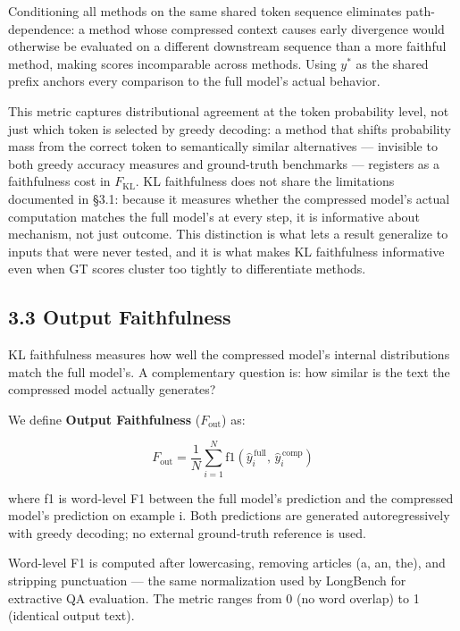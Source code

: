 \documentclass[10pt,letterpaper]{article}
\begin{document}
Conditioning all methods on the same shared token sequence eliminates
path-dependence: a method whose compressed context causes early
divergence would otherwise be evaluated on a different downstream
sequence than a more faithful method, making scores incomparable across
methods. Using \(y^*\) as the shared prefix anchors every comparison to
the full model's actual behavior.

This metric captures distributional agreement at the token probability
level, not just which token is selected by greedy decoding: a method
that shifts probability mass from the correct token to semantically
similar alternatives --- invisible to both greedy accuracy measures and
ground-truth benchmarks --- registers as a faithfulness cost in
\(F_{\text{KL}}\). KL faithfulness does not share the limitations
documented in §3.1: because it measures whether the compressed model's
actual computation matches the full model's at every step, it is
informative about mechanism, not just outcome. This distinction is what
lets a result generalize to inputs that were never tested, and it is
what makes KL faithfulness informative even when GT scores cluster
too tightly to differentiate methods.

\hypertarget{output-faithfulness}{%
\subsection{3.3 Output Faithfulness}\label{output-faithfulness}}

KL faithfulness measures how well the compressed model's internal
distributions match the full model's. A complementary question is: how
similar is the text the compressed model actually generates?

We define \textbf{Output Faithfulness} (\(F_{\text{out}}\)) as:

\[
F_{\text{out}} = \frac{1}{N} \sum_{i=1}^{N}
  \text{f1}\!\left(\hat{y}^{\,\text{full}}_i,\, \hat{y}^{\,\text{comp}}_i\right)
\]

where f1 is word-level F1 between the full model's prediction and the
compressed model's prediction on example i. Both predictions are
generated autoregressively with greedy decoding; no external
ground-truth reference is used.

Word-level F1 is computed after lowercasing, removing articles (a, an,
the), and stripping punctuation --- the same normalization used by
LongBench for extractive QA evaluation. The metric ranges from 0 (no
word overlap) to 1 (identical output text).
\end{document}

